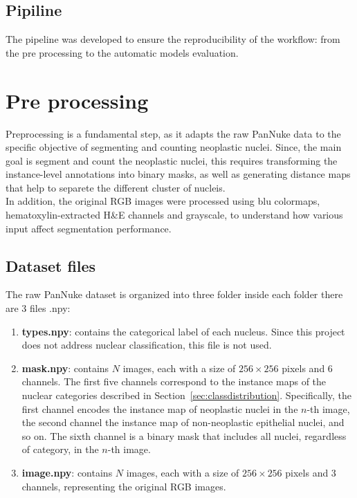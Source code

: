 \documentclass[target=bach,aauheader=,style=]{thud}
\begin{document}
\subsection{Pipiline}
The pipeline was developed to ensure the reproducibility of the workflow: from the pre processing to the automatic models evaluation. 
\section{Pre processing}
Preprocessing is a fundamental step, as it adapts the raw PanNuke data to the specific objective of segmenting and counting neoplastic nuclei. Since, the main goal is segment and count the neoplastic nuclei, this requires transforming the instance-level annotations into binary masks, as well as generating distance maps that help to separete the different cluster of nucleis.\\
In addition, the original RGB images were processed using blu colormaps, hematoxylin-extracted H\&E channels and grayscale, to understand how various input affect segmentation performance.
\subsection{Dataset files}
\label{sec:datafiles}
The raw PanNuke dataset is organized into three folder inside each folder there are 3 files .npy:

\begin{enumerate}
    \item \textbf{types.npy}: contains the categorical label of each nucleus. Since this project does not address nuclear classification, this file is not used.
    
    \item \textbf{mask.npy}: contains $N$ images, each with a size of $256 \times 256$ pixels and 6 channels.  
    The first five channels correspond to the instance maps of the nuclear categories described in Section~\ref{sec:classdistribution}.  
    Specifically, the first channel encodes the instance map of neoplastic nuclei in the $n$-th image, the second channel the instance map of non-neoplastic epithelial nuclei, and so on.  
    The sixth channel is a binary mask that includes all nuclei, regardless of category, in the $n$-th image.
    
    \item \textbf{image.npy}: contains $N$ images, each with a size of $256 \times 256$ pixels and 3 channels, representing the original RGB images.
\end{enumerate}
\begin{center}
\end{center}
\end{document}
